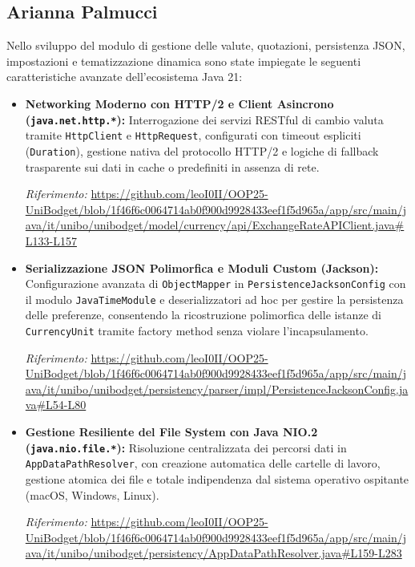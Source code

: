 \documentclass[11pt,a4paper,openright]{report}
\begin{document}
\subsection{Arianna Palmucci}

Nello sviluppo del modulo di gestione delle valute, quotazioni, persistenza JSON, impostazioni e tematizzazione dinamica sono state impiegate le seguenti caratteristiche avanzate dell'ecosistema Java 21:

\begin{itemize}[itemsep=5pt,topsep=3pt]
  \item \textbf{Networking Moderno con HTTP/2 e Client Asincrono (\texttt{java.net.http.*}):} Interrogazione dei servizi RESTful di cambio valuta tramite \texttt{HttpClient} e \texttt{HttpRequest}, configurati con timeout espliciti (\texttt{Duration}), gestione nativa del protocollo HTTP/2 e logiche di fallback trasparente sui dati in cache o predefiniti in assenza di rete.
  \par\emph{Riferimento:} \url{https://github.com/leoI0II/OOP25-UniBodget/blob/1f46f6c0064714ab0f900d9928433eef1f5d965a/app/src/main/java/it/unibo/unibodget/model/currency/api/ExchangeRateAPIClient.java#L133-L157}

  \item \textbf{Serializzazione JSON Polimorfica e Moduli Custom (Jackson):} Configurazione avanzata di \texttt{ObjectMapper} in \texttt{PersistenceJacksonConfig} con il modulo \texttt{JavaTimeModule} e deserializzatori ad hoc per gestire la persistenza delle preferenze, consentendo la ricostruzione polimorfica delle istanze di \texttt{CurrencyUnit} tramite factory method senza violare l'incapsulamento.
  \par\emph{Riferimento:} \url{https://github.com/leoI0II/OOP25-UniBodget/blob/1f46f6c0064714ab0f900d9928433eef1f5d965a/app/src/main/java/it/unibo/unibodget/persistency/parser/impl/PersistenceJacksonConfig.java#L54-L80}

  \item \textbf{Gestione Resiliente del File System con Java NIO.2 (\texttt{java.nio.file.*}):} Risoluzione centralizzata dei percorsi dati in \texttt{AppDataPathResolver}, con creazione automatica delle cartelle di lavoro, gestione atomica dei file e totale indipendenza dal sistema operativo ospitante (macOS, Windows, Linux).
  \par\emph{Riferimento:} \url{https://github.com/leoI0II/OOP25-UniBodget/blob/1f46f6c0064714ab0f900d9928433eef1f5d965a/app/src/main/java/it/unibo/unibodget/persistency/AppDataPathResolver.java#L159-L283}


\end{itemize}
\end{document}
